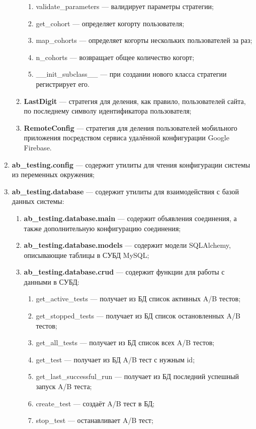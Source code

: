 \documentclass[../document.tex]{subfiles}
\begin{document}
\begin{enumerate}
\begin{enumerate}
\begin{enumerate}
				\item validate\_parameters --- валидирует параметры стратегии;
				\item get\_cohort --- определяет когорту пользователя;
				\item map\_cohorts --- определяет когорты нескольких пользователей за раз;
				\item n\_cohorts --- возвращает общее количество когорт;
				\item \_\_init\_subclass\_\_ --- при создании нового класса стратегии регистрирует его.
			\end{enumerate}
			\item \textbf{LastDigit} --- стратегия для деления, как правило, пользователей сайта, по последнему символу идентификатора пользователя;
			\item \textbf{RemoteConfig} --- стратегия для деления пользователей мобильного приложения посредством сервиса удалённой конфигурации Google Firebase.
		\end{enumerate}
		\item \textbf{ab\_testing.config} --- содержит утилиты для чтения конфигурации системы из переменных окружения;
		\item \textbf{ab\_testing.database} --- содержит утилиты для взаимодействия с базой данных системы:
		\begin{enumerate}
			\item \textbf{ab\_testing.database.main} --- содержит объявления соединения, а также дополнительную конфигурацию соединения;
			\item \textbf{ab\_testing.database.models} --- содержит модели SQLAlchemy, описывающие таблицы в СУБД MySQL;
			\item \textbf{ab\_testing.database.crud} --- содержит функции для работы с данными в СУБД:
			\begin{enumerate}
				\item get\_active\_tests --- получает из БД список активных A/B тестов;
				\item get\_stopped\_tests --- получает из БД список остановленных A/B тестов;
				\item get\_all\_tests --- получает из БД список всех A/B тестов;
				\item get\_test --- получает из БД A/B тест с нужным id;
				\item get\_last\_successful\_run --- получает из БД последний успешный запуск A/B теста;
				\item create\_test --- создаёт A/B тест в БД;
				\item stop\_test --- останавливает A/B тест;

\end{enumerate}
\end{enumerate}
\end{enumerate}
\end{document}
